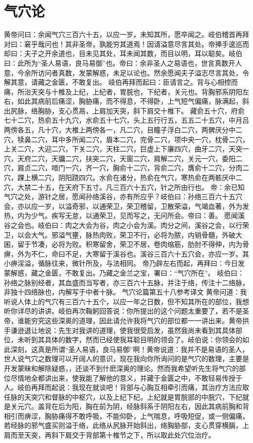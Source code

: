 \documentclass[a4paper,12pt,UTF8,twoside]{ctexbook}
\begin{document}
\chapter{气穴论}
黄帝问曰：余闻气穴三百六十五，以应一岁，未知其所，愿卒闻之。岐伯稽首再拜对曰：窘乎哉问也！其非圣帝，孰能穷其道焉！因请溢意尽言其处。帝捧手逡巡而却曰：夫子之开余道也，目未见其处，耳未闻其数，而目以明，耳以聪矣。岐伯曰：此所为“圣人易语，良马易御”也。帝曰：余非圣人之易语也，世言真数开人意，今余所访问者真数，发蒙解惑，未足以论也。然余愿闻夫子溢志尽言其处，令解其意，请藏之金匮，不敢复出。
岐伯再拜而起曰：臣请言之。背与心相控而痛，所治天突与十椎及上纪，上纪者，胃脘也，下纪者，关元也。背胸邪系阴阳左右，如此其病前后痛涩，胸胁痛，而不得息，不得卧，上气短气偏痛，脉满起，斜出尻脉，络胸胁，支心贯鬲，上肩加天突，斜下肩交十椎下。
藏俞五十穴，府俞七十二穴，热俞五十九穴，水俞五十七穴，头上五行行五，五五二十五穴，中月吕两傍各五，凡十穴，大椎上两傍各一，凡二穴，目瞳子浮白二穴，两髀厌分中二穴，犊鼻二穴，耳中多所闻二穴，眉本二穴，完骨二穴，项中央一穴，枕骨二穴，上关二穴，大迎二穴，下关二穴，天柱二穴，巨虚上下廉四穴，曲牙二穴，天突一穴，天府二穴，天牖二穴，扶突二穴，天窗二穴，肩解二穴，关元一穴，委阳二穴，肩贞二穴，喑门一穴，齐一穴，胸俞十二穴，背俞二穴，膺俞十二穴，分肉二穴，踝上横二穴，阴阳跷四穴。水俞在诸分，热俞在气穴，寒热俞在两骸厌中二穴，大禁二十五，在天府下五寸。凡三百六十五穴，针之所由行也。
帝：余已知气穴之处，游针之居，愿闻孙络溪谷，亦有所应乎？岐伯曰：孙络三百六十五穴会，亦以应一岁，以溢奇邪，以通荣卫，荣卫稽留，卫散荣溢，气竭血著，外为发热，内为少气。疾写无怠，以通荣卫，见而写之，无问所会。帝曰：善。
愿闻溪谷之会也。岐伯曰：肉之大会为谷，肉之小会为溪。肉分之间，溪谷之会，以行荣卫，以会大气。邪溢气壅，脉热肉败，荣卫不行，必将为脓，内销骨髓，外破大囷，留于节凑，必将为败。积寒留舍，荣卫不居，卷肉缩筋，肋肘不得伸，内为骨痹，外为不仁，命曰不足，大寒留于溪谷也。溪谷三百六十五穴会，亦应一岁。其小痹淫溢，循脉往来，微针所及，与法相同。
帝乃辟左右而起，再拜曰：今日发蒙解惑，藏之金匮，不敢复出。乃藏之金兰之宝，署曰：“气穴所在”。
岐伯曰：孙络之脉别经者，其血盛而当写者，亦三百六十五脉，并注于络，传注十二络脉，非独十四络脉也，内解写于中者十脉。
气穴论篇第五十八参考译文
黄帝问道：我听说人体上的气穴有三百六十五个，以应一年之日数，但不知其所在的部位，我想听你详尽的讲讲。岐伯再次鞠躬回答说：你所提出的这个问题太重要了，若不是圣帝，谁能穷究这些深奥的道理，因此请允许我将气穴的部位都一一讲出来。黄帝拱手谦逊退让地说：先生对我讲的道理，使我很受启发，虽然我尚未看到其具体部位，未听到其具体的数字，然而已经使我耳聪目明的领会了。岐伯说：你领会的如此深刻，这真是所谓“圣人易语，良马易御”啊！黄帝说道：我并不是易语的圣人，世人说气穴之数理可以开阔人的意识，现在我向你所询问的是气穴的数理，主要是开发蒙昧和解除疑惑，，还谈不到什麽深奥的理论。然而我希望听先生将气穴的部位尽情地全都讲出来，使我能了解他的意义，并藏于金匮之中，不敢轻易传授于人。岐伯再拜而起说：我现在就谈吧！背部与心胸互相牵引而痛，其治疗方法应取任脉的天突穴和督脉的中枢穴，以及上纪下纪。上纪就是胃脘部的中脘穴，下纪就是关元穴。盖背在后为阳，胸在前为阴，经脉斜系于阴阳左右，因此其病前胸和背相引而痹涩，胸胁痛得不敢呼吸，不能仰卧，上气喘息，呼吸短促，或一侧偏痛，若经脉的邪气盛买则溢于络，此络从尻脉开始斜出，络胸胁部，支心贯穿横膈，上肩而至天突，再斜下肩交于背部第十椎节之下，所以取此处穴位治疗。
\end{document}
